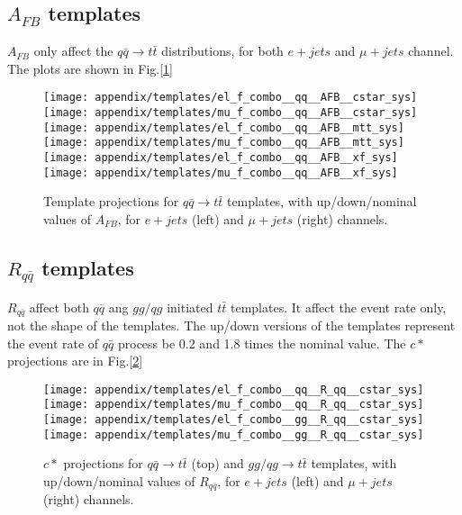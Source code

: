 \subsection{$A_{FB}$ templates}
$A_{FB}$ only affect the $q\bar q \rightarrow t \bar t$ distributions, for both $e+jets$ and $\mu+jets$ channel. The plots are shown in Fig.[\ref{appendix:afb_temps}]
\begin{figure}[hbt]
  \begin{center}
    \texttt{[image: appendix/templates/el\_f\_combo\_\_qq\_\_AFB\_\_cstar\_sys]}
    \texttt{[image: appendix/templates/mu\_f\_combo\_\_qq\_\_AFB\_\_cstar\_sys]}
    \texttt{[image: appendix/templates/el\_f\_combo\_\_qq\_\_AFB\_\_mtt\_sys]}
    \texttt{[image: appendix/templates/mu\_f\_combo\_\_qq\_\_AFB\_\_mtt\_sys]}
    \texttt{[image: appendix/templates/el\_f\_combo\_\_qq\_\_AFB\_\_xf\_sys]}
    \texttt{[image: appendix/templates/mu\_f\_combo\_\_qq\_\_AFB\_\_xf\_sys]}
  \caption{\small Template projections for $q\bar q \rightarrow t\bar t$ templates, with up/down/nominal values of $A_{FB}$, for $e+jets$ (left) and $\mu+jets$ (right) channels. }
  \label{appendix:afb_temps}
  \end{center}
\end{figure}
 
\subsection{$R_{q\bar q}$ templates}
$R_{q\bar q}$ affect both $q\bar q$ ang $gg/qg$ initiated $t\bar t$ templates. It affect the event rate only, not the shape of the templates. The up/down versions of the templates represent the event rate of $q\bar q$ process be 0.2 and 1.8 times the nominal value. The $c*$ projections are in Fig.[\ref{appendix:Rqq_temps}]

\begin{figure}[hbt]
  \begin{center}
    \texttt{[image: appendix/templates/el\_f\_combo\_\_qq\_\_R\_qq\_\_cstar\_sys]}
    \texttt{[image: appendix/templates/mu\_f\_combo\_\_qq\_\_R\_qq\_\_cstar\_sys]}
    \texttt{[image: appendix/templates/el\_f\_combo\_\_gg\_\_R\_qq\_\_cstar\_sys]}
    \texttt{[image: appendix/templates/mu\_f\_combo\_\_gg\_\_R\_qq\_\_cstar\_sys]}
  \caption{\small $c*$ projections for $q\bar q \rightarrow t\bar t$ (top) and $gg/qg \rightarrow t\bar t$ templates, with up/down/nominal values of $R_{q\bar q}$, for $e+jets$ (left) and $\mu+jets$ (right) channels. }
  \label{appendix:Rqq_temps}
  \end{center}
\end{figure}
 
